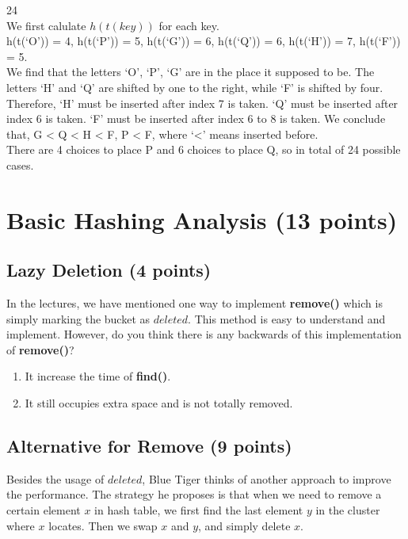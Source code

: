 \documentclass[11pt]{exam}
\begin{document}
\begin{solution}
 24 \\  
 We first calulate $h(t(key))$ for each key.\\
h(t(`O')) = 4, h(t(`P')) = 5, h(t(`G')) = 6, h(t(`Q')) = 6, h(t(`H')) = 7, h(t(`F')) = 5.\\
We find that the letters `O', `P', `G' are in the place it supposed to be. The letters 
`H' and `Q' are shifted by one to the right, while `F' is shifted by four. \\
Therefore, `H' must be inserted after index 7 is taken. `Q' must be inserted after index 6 is taken. `F' must be 
inserted after index 6 to 8 is taken. We conclude that, G < Q < H < F, P < F, where `<' means inserted before.\\
There are 4 choices to place P and 6 choices to place Q, so in total of 24 possible cases. 
\end{solution}

\section{Basic Hashing Analysis (13 points)}
\subsection{Lazy Deletion (4 points)}
In the lectures, we have mentioned one way to implement \textbf{remove()} which is simply marking the bucket as $deleted$. This method is easy to understand and implement. However, do you think there is any backwards of this implementation of \textbf{remove()}?

\begin{solution}
    \begin{enumerate}
        \item It increase the time of \textbf{find()}.
        \item It still occupies extra space and is not totally removed.
    \end{enumerate}
\end{solution}

\subsection{Alternative for Remove (9 points)}
Besides the usage of $deleted$, Blue Tiger thinks of another approach to improve the performance. The strategy he proposes is that when we need to remove a certain element $x$ in hash table, we first find the last element $y$ in the cluster where $x$ locates. Then we swap $x$ and $y$, and simply delete $x$. 
\end{document}
